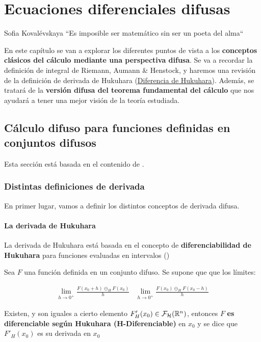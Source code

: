
\chapter{Ecuaciones diferenciales difusas}
\begin{chapquote}{Sofia Kovalévskaya}
	``Es imposible ser matemático sin ser un poeta del alma``
\end{chapquote}
En este capítulo se van a explorar los diferentes puntos de vista a los \textbf{conceptos clásicos del cálculo mediante una perspectiva difusa}. Se va a recordar la definición de integral de Riemann, Aumann \& Henstock, y haremos una revisión de la definición de derivada de Hukuhara (\hyperref[def:hukukara]{Diferencia de Hukuhara}). Además, se tratará de la \textbf{versión difusa del teorema fundamental del cálculo} que nos ayudará a tener una mejor visión de la teoría estudiada.

\section{Cálculo difuso para funciones definidas en conjuntos difusos}
Esta sección está basada en el contenido de \cite{fuzzyintro}.
\subsection{Distintas definiciones de derivada}
En primer lugar, vamos a definir los distintos conceptos de derivada difusa.

\subsubsection{La derivada de Hukuhara}
La derivada de Hukuhara está basada en el concepto de \textbf{diferenciabilidad de Hukuhara} para funciones evaluadas en intervalos (\cite{derivatehukuhara})

\begin{definicion}
  Sea $F$ una función definida en un conjunto difuso. Se supone que que los límites:
  
  \[
  \begin{array}{c||c}
    \lim\limits_{h \rightarrow 0^+} \frac{F(x_0 + h) \circleddash_H F(x_0)}{h} & \lim\limits_{h \rightarrow 0^+} \frac{F(x_0) \circleddash_H F(x_0 - h)}{h}
  \end{array}
  \]
  
  Existen, y son iguales a cierto elemento $F'_H(x_0) \in \mathcal{F}_\mathcal{H}(\mathbb R^n)$, entonces $F$ \textbf{es diferenciable según Hukuhara (H-Diferenciable)} en $x_0$ y se dice que $F'_H(x_0)$ es su derivada en $x_0$ 
\end{definicion}

